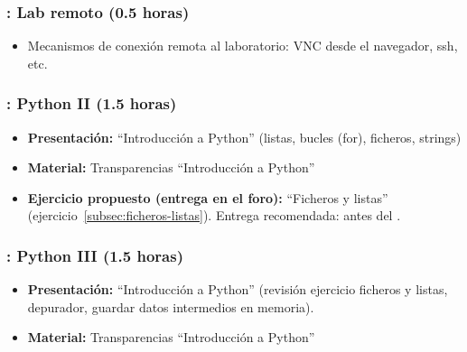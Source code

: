 \documentclass[a4paper,12pt]{article}
\begin{document}
\subsubsection{\lunesB: Lab remoto (0.5 horas)}
\label{cal:lunesB}

\begin{itemize}
\item Mecanismos de conexión remota al laboratorio: VNC desde el navegador, ssh, etc.
\end{itemize}

\subsubsection{\lunesB: Python II (1.5 horas)}
\label{cal:lunesBb}

\begin{itemize}
\item \textbf{Presentación:} ``Introducción a Python'' (listas, bucles (for), ficheros, strings)
\item \textbf{Material:} Transparencias ``Introducción a Python''
\item \textbf{Ejercicio propuesto (entrega en el foro):} ``Ficheros y listas'' (ejercicio~\ref{subsec:ficheros-listas}).
   Entrega recomendada: antes del \lunesC.
\end{itemize}


\subsubsection{\lunesC: Python III (1.5 horas)}
\label{cal:lunesC}

\begin{itemize}
\item \textbf{Presentación:} ``Introducción a Python'' (revisión ejercicio ficheros y listas, depurador, guardar datos intermedios en memoria).
\item \textbf{Material:} Transparencias ``Introducción a Python''

\end{itemize}
\end{document}
